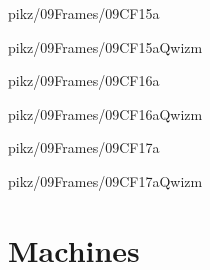 \documentclass[9pt,xcolor={svgnames, x11names}]{beamer}
\begin{document}

\begin{frame}{pikz/09Frames/09CF15a}
  
\end{frame}


\begin{frame}{pikz/09Frames/09CF15aQwizm}
  
\end{frame}


\begin{frame}{pikz/09Frames/09CF16a}
  
\end{frame}


\begin{frame}{pikz/09Frames/09CF16aQwizm}
  
\end{frame}


\begin{frame}{pikz/09Frames/09CF17a}
  
\end{frame}


\begin{frame}{pikz/09Frames/09CF17aQwizm}
  
\end{frame}



\section{Machines}
\end{document}
